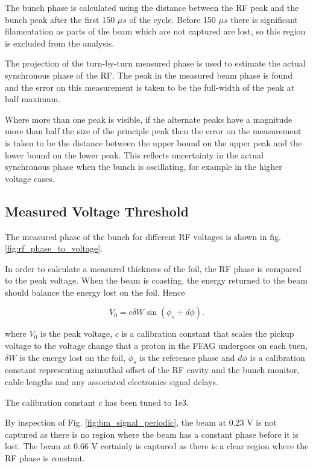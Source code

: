 \documentclass{paper}
\begin{document}
The bunch phase is calculated using the distance between the RF peak and the 
bunch peak after the first 150 $\mu s$ of the cycle. Before 150 $\mu s$ there
is significant filamentation as parts of the beam which are not captured are 
lost, so this region is excluded from the analysis. 

The projection of the turn-by-turn measured phase is used to estimate the actual
synchronous phase of the RF. The peak in the measured beam phase is found and
the error on this measurement is taken to be the full-width of the peak at half
maximum.

Where more than one peak is visible, if the alternate peaks have a 
magnitude  more than half the size of the principle peak then the error on the 
measurement is taken to be the distance between the upper bound on the upper 
peak and the lower bound on the lower peak. This reflects uncertainty in the 
actual synchronous phase when the bunch is oscillating, for example in the
higher voltage cases.

\subsection{Measured Voltage Threshold}
The measured phase of the bunch for different RF voltages is shown in fig.
\ref{fig:rf_phase_to_voltage}.

In order to calculate a measured thickness of the foil, the RF phase is compared
to the peak voltage. When the beam is coasting, the energy returned to the beam
should balance the energy lost on the foil. Hence

\begin{equation}
\label{eq:bm_signal_fit}
V_0 = c\delta W \sin (\phi_s+d\phi).
\end{equation}

where $V_0$ is the peak voltage, $c$ is a calibration constant that scales the
pickup voltage to the voltage change that a proton in the FFAG undergoes on each
tuen, $\delta W$ is
the energy lost on the foil, $\phi_s$ is the reference phase and $d\phi$ is a 
calibration constant representing azimuthal offset of the RF cavity and the 
bunch monitor, cable lengths and any associated electronics signal delays.

The calibration constant $c$ has been tuned to 1e3.

By inspection of Fig. \ref{fig:bm_signal_periodic}, the beam at 0.23 V is not 
captured as there is no region where the beam has a constant phase before it is 
lost. The beam at 0.66 V certainly is captured as there is a clear region where 
the RF phase is constant.
\end{document}
